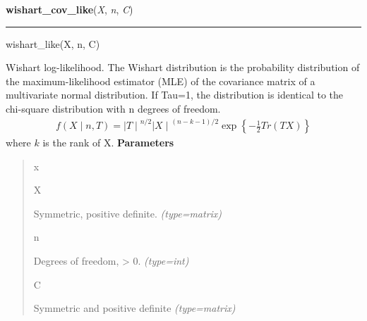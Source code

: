     \label{pymc:distributions:wishart_cov_like}

    \vspace{0.5ex}

\hspace{.8\funcindent}\begin{boxedminipage}{\funcwidth}

    \raggedright \textbf{wishart\_cov\_like}(\textit{X}, \textit{n}, \textit{C})

    \vspace{-1.5ex}

    \rule{\textwidth}{1pt}
\setlength{\parskip}{2ex}

wishart{\_}like(X, n, C)

Wishart log-likelihood. The Wishart distribution is the probability
distribution of the maximum-likelihood estimator (MLE) of the covariance
matrix of a multivariate normal distribution. If Tau=1, the distribution
is identical to the chi-square distribution with n degrees of freedom.
\begin{equation*}\begin{split}f(X \mid n, T) = {\mid T \mid}^{n/2}{\mid X \mid}^{(n-k-1)/2} \exp\left\{ -\frac{1}{2} Tr(TX) \right\}\end{split}\end{equation*}
where $k$ is the rank of X.
\setlength{\parskip}{1ex}
      \textbf{Parameters}
      \vspace{-1ex}

      \begin{quote}
        \begin{Ventry}{x}

          \item[X]


Symmetric, positive definite.
            {\it (type=matrix)}

          \item[n]


Degrees of freedom, {\textgreater} 0.
            {\it (type=int)}

          \item[C]


Symmetric and positive definite
            {\it (type=matrix)}

        \end{Ventry}

      \end{quote}

    \end{boxedminipage}

